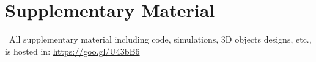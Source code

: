\chapter*{Supplementary Material} \label{supplementary}
\
All supplementary material including code, simulations, 3D objects designs, etc., is hosted in:
\url{https://goo.gl/U43bB6}
